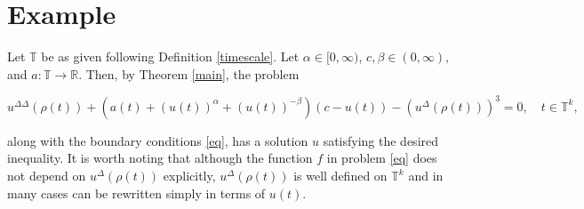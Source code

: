 \documentclass[12pt,reqno]{amsart}
\begin{document}
\section{Example}
Let $\mathbb{T}$ be as given following Definition \ref{timescale}. Let $\alpha \in [0, \infty)$, $c, \beta \in (0, \infty),$ and $a : \mathbb{T} \rightarrow \mathbb{R}.$  Then, by Theorem \ref{main}, the problem
\begin{tiny}
	\begin{equation*}
	u^{\Delta\Delta}(\rho(t)) + \left(a(t) + \left(u(t)\right)^\alpha + \left(u(t)\right)^{-\beta}\right)\left(c - u(t)\right) - \left(u^{\Delta}(\rho(t))\right)^3 = 0, \quad t \in \mathbb{T}^k,
	\end{equation*}
\end{tiny}
along with the boundary conditions \eqref{eq}, has a solution $u$ satisfying the desired inequality.  It is worth noting that although the function $f$ in problem \eqref{eq} does not depend on $u^{\Delta}(\rho(t))$ explicitly, $u^{\Delta}(\rho(t))$ is well defined on $\mathbb{T}^k$ and in many cases can be rewritten simply in terms of $u(t).$



%
%
\end{document}
